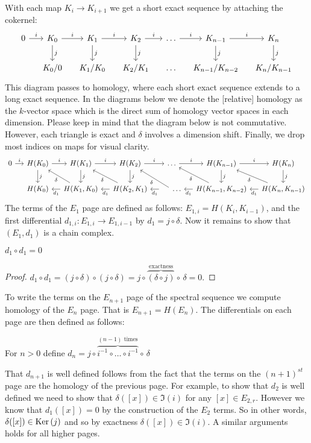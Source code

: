 \noindent With each map $K_i \rightarrow K_{i+1}$ we get a short exact sequence by attaching the cokernel:
\[
\begin{tikzcd} [column sep=small]
0 \arrow{r}{i} & \K_0 \arrow{r}{i}\arrow{d}{j} & \K_1 \arrow{r}{i}\arrow{d}{j}   & \K_2 \arrow{r}{i}\arrow{d}{j} & \ldots \arrow{r}{i} & \K_{n-1} \arrow{r}{i} \arrow{d}{j} & \K_n\arrow{d}{j} \\ 		&     \K_0/{0} &			 \K_1/{\K_0} & 	 \K_2/{\K_{1}}		   & \ldots  			   & \K_{n-1}/{\K_{n-2}}		 & \K_n/{\K_{n-1}} 
\end{tikzcd}
\]
This diagram passes to homology, where each short exact sequence extends to a long exact sequence. In the diagrams below we denote the [relative] homology as the $k$-vector space which is the direct sum of homology vector spaces in each dimension. Please keep in mind that the diagram below is not commutative. However, each triangle is exact and $\delta$ involves a dimension shift. Finally, we drop most indices on maps for visual clarity.
\[
\begin{tikzcd}[column sep=small]
0 \arrow{r}{i} & H(\K_0 \arrow{r}{i}\arrow{d}{j}) & H(\K_1 \arrow{r}{i}\arrow{d}{j})   & H(\K_2 \arrow{r}{i}\arrow{d}{j}) & \ldots \arrow{r}{i} & H(\K_{n-1}) \arrow{r}{i} \arrow{d}{j} & H(\K_n\arrow{d}{j}) \\ 		
&     H(\K_0) &			\arrow{l}{d_{1}} \arrow{ul}{\delta}  H(\K_1, {\K_0}) & 	\arrow{l}{d_{1}} \arrow{ul}{\delta} H(\K_2, {\K_{1}})		   & \arrow{l}{d_{1}} \arrow{ul}{\delta} \hspace{.5cm} \ldots  			   &\arrow{l}{d_{1}}\arrow{ul}{\delta}H(\K_{n-1}, {\K_{n-2}})		 & \arrow{l}{d_{1}} \arrow{ul}{\delta} H(\K_n, {\K_{n-1}})
\end{tikzcd}
\]
The terms of the $E_1$ page are defined as follows: $E_{1,i} = H(K_i, K_{i-1})$, and the first differential $d_{1,i}: E_{1,i} \rightarrow E_{1,{i-1}}$ by $d_1 = j \circ \delta$. Now it remains to show that $(E_1, d_1)$ is a chain complex.
\begin{lemma} $d_1 \circ d_1 = 0$ \end{lemma} 
\begin{proof}
$d_1 \circ d_1 = (j \circ \delta) \circ (j \circ \delta) = j \circ \overbrace{(\delta \circ j)}^{\textrm{exactness}} \circ\, \delta = 0.$
\end{proof}
To write the terms on the $E_{n+1}$ page of the spectral sequence we compute homology of the $E_{n}$ page. 
That is $E_{n+1} = H(E_n)$. 
The differentials on each page are then defined as follows:
\begin{definition} For $n > 0$ define $d_n = j \circ \overbrace{i^{-1} \circ \ldots \circ i^{-1}}^{(n-1)\textrm{ times}} \circ\, \delta$
\end{definition}
That $d_{n+1}$ is well defined follows from the fact that the terms on the $(n+1)^{st}$ page are the homology of the previous page. For example, to show that $d_2$ is well defined we need to show that $\delta([x]) \in \Im(i)$ for any $[x] \in E_{2,r}$. However we know that $d_1([x]) = 0$ by the construction of the $E_2$ terms. So in other words, $\delta([x]) \in \operatorname{Ker}{(j)}$ and so by exactness $\delta([x]) \in \Im(i)$. A similar arguments holds for all higher pages.

